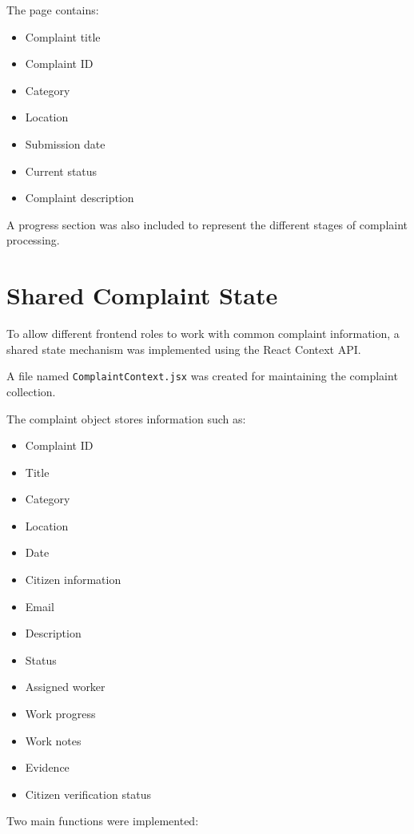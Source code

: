 \documentclass[12pt,a4paper]{article}
\begin{document}
The page contains:

\begin{itemize}
    \item Complaint title
    \item Complaint ID
    \item Category
    \item Location
    \item Submission date
    \item Current status
    \item Complaint description
\end{itemize}

A progress section was also included to represent the different stages of
complaint processing.

\section{Shared Complaint State}

To allow different frontend roles to work with common complaint information,
a shared state mechanism was implemented using the React Context API.

A file named \texttt{ComplaintContext.jsx} was created for maintaining the
complaint collection.

The complaint object stores information such as:

\begin{itemize}
    \item Complaint ID
    \item Title
    \item Category
    \item Location
    \item Date
    \item Citizen information
    \item Email
    \item Description
    \item Status
    \item Assigned worker
    \item Work progress
    \item Work notes
    \item Evidence
    \item Citizen verification status
\end{itemize}

Two main functions were implemented:
\end{document}
